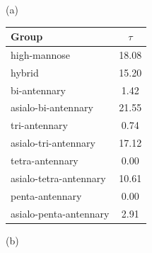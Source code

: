     \begin{table}
        \begin{minipage}[t]{0.25\linewidth}
            \vspace{0pt}
            (a)
            \centering
            
    \begin{tabular}{l | c}
        Group & $\tau$ \\
        \hline
        high-mannose & 18.08 \\
        hybrid & 15.20 \\
        bi-antennary & 1.42 \\
        asialo-bi-antennary & 21.55 \\
        tri-antennary & 0.74 \\
        asialo-tri-antennary & 17.12 \\
        tetra-antennary & 0.00 \\
        asialo-tetra-antennary & 10.61 \\
        penta-antennary & 0.00 \\
        asialo-penta-antennary & 2.91 \\
    \end{tabular}
    
            
        \end{minipage}
        \hspace{1cm}
        \begin{minipage}[t]{0.55\linewidth}
            \vspace{0pt}
            (b)
            \centering
            

\end{minipage}
\end{table}
